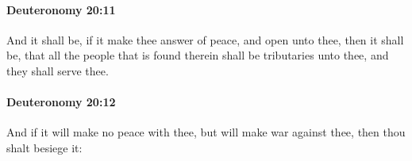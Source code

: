 		\paragraph{Deuteronomy 20:11} %
			\label{DEUTERONOMY-20-11}

			And it shall be, if it make thee answer of peace, and open unto thee, then it shall be, that all the people that is found therein shall be tributaries unto thee, and they shall serve thee.


		\paragraph{Deuteronomy 20:12} %
			\label{DEUTERONOMY-20-12}

			And if it will make no peace with thee, but will make war against thee, then thou shalt besiege it:


